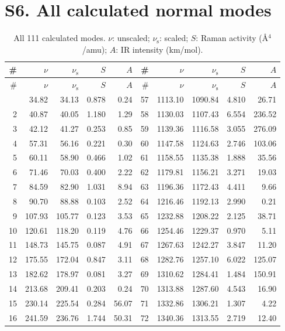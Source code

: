 \documentclass[11pt,a4paper]{article}
\begin{document}
\section*{S6. All calculated normal modes}
\begin{longtable}{rrrrr@{\hskip 1.6em}rrrrr}
\caption{All 111 calculated modes. $\nu$: unscaled; $\nu_{\mathrm{s}}$: scaled;
$S$: Raman activity (\AA$^4$/amu); $A$: IR intensity (km/mol).}\\
\toprule
\# & $\nu$ & $\nu_{\mathrm{s}}$ & $S$ & $A$ & \# & $\nu$ & $\nu_{\mathrm{s}}$ & $S$ & $A$ \\
\midrule\endfirsthead
\toprule
\# & $\nu$ & $\nu_{\mathrm{s}}$ & $S$ & $A$ & \# & $\nu$ & $\nu_{\mathrm{s}}$ & $S$ & $A$ \\
\midrule\endhead
\bottomrule\endfoot
1 & 34.82 & 34.13 & 0.878 & 0.24 & 57 & 1113.10 & 1090.84 & 4.810 & 26.71 \\
2 & 40.87 & 40.05 & 1.180 & 1.29 & 58 & 1130.03 & 1107.43 & 6.554 & 236.52 \\
3 & 42.12 & 41.27 & 0.253 & 0.85 & 59 & 1139.36 & 1116.58 & 3.055 & 276.09 \\
4 & 57.31 & 56.16 & 0.221 & 0.30 & 60 & 1147.58 & 1124.63 & 2.746 & 103.06 \\
5 & 60.11 & 58.90 & 0.466 & 1.02 & 61 & 1158.55 & 1135.38 & 1.888 & 35.56 \\
6 & 71.46 & 70.03 & 0.400 & 2.22 & 62 & 1179.81 & 1156.21 & 3.271 & 19.03 \\
7 & 84.59 & 82.90 & 1.031 & 8.94 & 63 & 1196.36 & 1172.43 & 4.411 & 9.66 \\
8 & 90.70 & 88.88 & 0.103 & 2.52 & 64 & 1216.46 & 1192.13 & 2.990 & 0.21 \\
9 & 107.93 & 105.77 & 0.123 & 3.53 & 65 & 1232.88 & 1208.22 & 2.125 & 38.71 \\
10 & 120.61 & 118.20 & 0.119 & 4.76 & 66 & 1254.46 & 1229.37 & 0.970 & 5.11 \\
11 & 148.73 & 145.75 & 0.087 & 4.91 & 67 & 1267.63 & 1242.27 & 3.847 & 11.20 \\
12 & 175.55 & 172.04 & 0.847 & 3.11 & 68 & 1282.76 & 1257.10 & 6.022 & 125.07 \\
13 & 182.62 & 178.97 & 0.081 & 3.27 & 69 & 1310.62 & 1284.41 & 1.484 & 150.91 \\
14 & 213.68 & 209.41 & 0.203 & 0.24 & 70 & 1313.88 & 1287.60 & 4.543 & 16.90 \\
15 & 230.14 & 225.54 & 0.284 & 56.07 & 71 & 1332.86 & 1306.21 & 1.307 & 4.22 \\
16 & 241.59 & 236.76 & 1.744 & 50.31 & 72 & 1340.36 & 1313.55 & 2.719 & 12.40 \\

\end{longtable}
\end{document}
